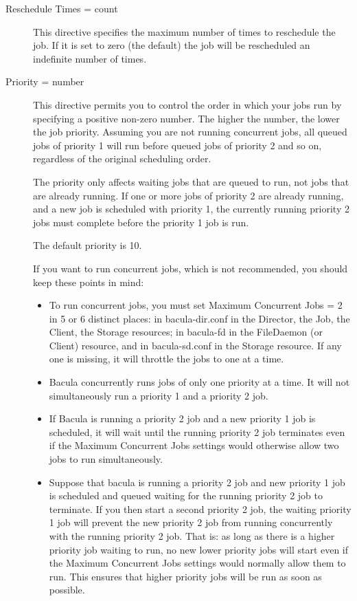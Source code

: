 \begin{description}
\item [Reschedule Times = \lt{}count\gt{}]
   This directive specifies the  maximum number of times to reschedule the job.
If it is set to zero  (the default) the job will be rescheduled an indefinite
number of times.  
\label{Priority}

\item [Priority = \lt{}number\gt{}]
   This directive permits you  to control the order in which your jobs run by
specifying a positive  non-zero number. The higher the number, the lower the
job priority.  Assuming you are not running concurrent jobs, all queued jobs
of  priority 1 will run before queued jobs of priority 2 and so on, 
regardless of the original scheduling order.  

The priority only affects waiting jobs that are queued to run, not jobs  that
are already running. If one or more jobs of priority 2 are already  running,
and a new job is scheduled with priority 1, the currently  running priority 2
jobs must complete before the priority 1 job is run.  

The default priority is 10.  

If you want to run concurrent jobs, which is not recommended, you should  keep
these points in mind:  

\begin{itemize}
\item To run concurrent jobs,  you must set Maximum Concurrent Jobs = 2 in 5
   or 6 distinct places:  in bacula-dir.conf in the Director, the Job, the
   Client, the Storage  resources; in bacula-fd in the FileDaemon (or Client)
   resource,  and in bacula-sd.conf in the Storage resource. If any one  is
   missing, it will throttle the jobs to one at a time.  
\item Bacula concurrently runs jobs of only one priority at a time. It will 
   not simultaneously run a priority 1 and a priority 2 job.  
\item If Bacula is running a priority 2 job and a new priority 1  job is
   scheduled, it will wait until the running priority 2 job  terminates even if
   the Maximum Concurrent Jobs settings  would otherwise allow two jobs to run
   simultaneously.  
\item Suppose that bacula is running a priority 2 job and new priority 1  job
   is scheduled and queued waiting for the running priority  2 job to terminate.
   If you then start a second priority 2 job,  the waiting priority 1 job  will
   prevent the new priority 2 job from running concurrently  with the running
   priority 2 job.  That is: as long as there is a higher priority job waiting to
   run, no new lower priority jobs will start even if  the Maximum Concurrent
   Jobs settings would normally allow  them to run. This ensures that higher
   priority jobs will  be run as soon as possible. 
\end{itemize}


\end{description}
